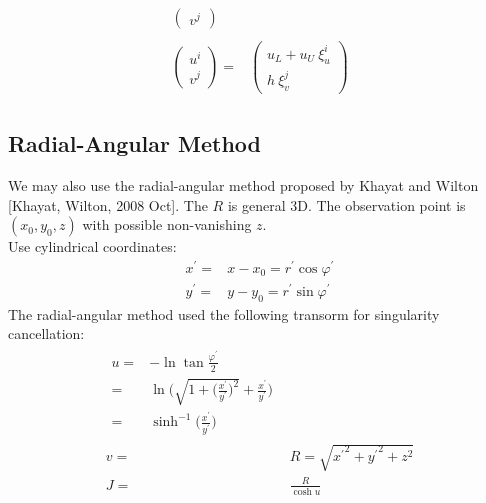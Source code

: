 \documentclass [10pt,letterpaper]{article}
\begin{document}
\begin{subequations}
\begin{align}
\begin{split}
\begin{pmatrix}
				v^j
			\end{pmatrix}
		\end{split}
		\\
		\begin{split} 
			\begin{pmatrix}
				u^i					\\
				v^j
			\end{pmatrix}
			=&
			\begin{pmatrix}
				u_L
				+ 
				u_U
				\ \xi_u^i				\\
				h
				\ \xi_v^j
			\end{pmatrix}
		\end{split}
	\end{align}
\end{subequations}
\subsection{Radial-Angular Method}
\label{sub:radial-angular-method}
We may also use the radial-angular method proposed by Khayat and Wilton [Khayat, Wilton, 2008 Oct].
The $R$ is general 3D.
The observation point is $(x_0,y_0,z)$ with possible non-vanishing $z$.
\\
Use cylindrical coordinates:
\begin{subequations} \label{eq:def-radial-angular-method-xp-yp-rp-varphip}
	\begin{align} 
		x^{\prime} =& x-x_0 = r^{\prime} \cos{\varphi^{\prime}}	\\
		y^{\prime} =& y-y_0 = r^{\prime} \sin{\varphi^{\prime}}
	\end{align}
\end{subequations}
The radial-angular method used the following transorm for singularity cancellation:
\begin{subequations} \label{eq:def-radial-angular-method-u-v-J}
	\begin{align}
		\begin{split} 
			u 
			=&
				-
				\ln{\tan{\frac{\varphi^{\prime}}{2}}}
			\\
			=&
				\ln\bigg(
					\sqrt{ 1 + \bigg(
						\frac{x^{\prime}}{y^{\prime}} \bigg)^2 }
					+
					\frac{x^{\prime}}{y^{\prime}}
				\bigg) 
			\\
			=&
				\sinh^{-1} \bigg(
					\frac{x^{\prime}}{y^{\prime}}
				\bigg)
		\end{split}
		\\
		v
		=&
			R
			= 
			\sqrt{ {x^{\prime}}^2 + {y^{\prime}}^2 + z^2 }	
		\\
		J
		=&
			\frac{R}{\cosh{u}}
	\end{align}
\end{subequations}
\end{document}
